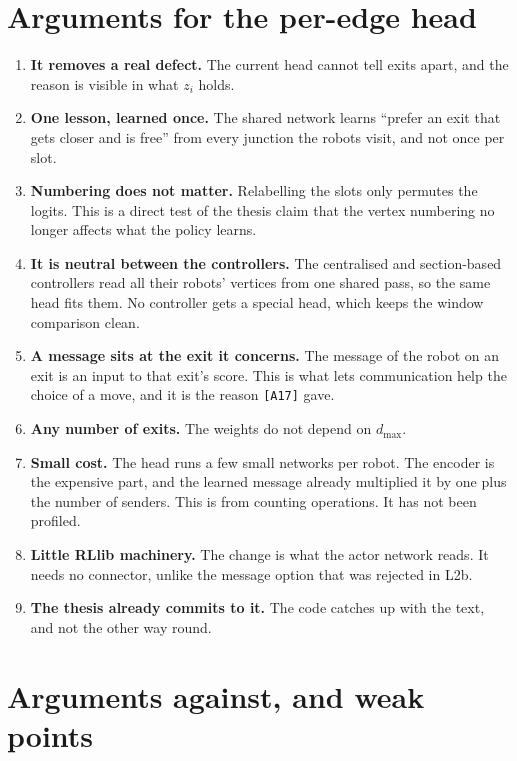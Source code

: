 \documentclass[11pt,a4paper]{article}
\begin{document}
\section{Arguments for the per-edge head}

\begin{enumerate}[leftmargin=1.6em, itemsep=3pt]
  \item \textbf{It removes a real defect.} The current head cannot tell
    exits apart, and the reason is visible in what $z_i$ holds.
  \item \textbf{One lesson, learned once.} The shared network learns ``prefer
    an exit that gets closer and is free'' from every junction the robots
    visit, and not once per slot.
  \item \textbf{Numbering does not matter.} Relabelling the slots only
    permutes the logits. This is a direct test of the thesis claim that the
    vertex numbering no longer affects what the policy learns.
  \item \textbf{It is neutral between the controllers.} The centralised and
    section-based controllers read all their robots' vertices from one
    shared pass, so the same head fits them. No controller gets a special
    head, which keeps the window comparison clean.
  \item \textbf{A message sits at the exit it concerns.} The message of the
    robot on an exit is an input to that exit's score. This is what lets
    communication help the choice of a move, and it is the reason
    \texttt{[A17]} gave.
  \item \textbf{Any number of exits.} The weights do not depend on $d_{\max}$.
  \item \textbf{Small cost.} The head runs a few small networks per robot.
    The encoder is the expensive part, and the learned message already
    multiplied it by one plus the number of senders. This is from counting
    operations. It has not been profiled.
  \item \textbf{Little RLlib machinery.} The change is what the actor
    network reads. It needs no connector, unlike the message option that was
    rejected in L2b.
  \item \textbf{The thesis already commits to it.} The code catches up with
    the text, and not the other way round.
\end{enumerate}

\section{Arguments against, and weak points}
\label{sec:weak}
\end{document}
